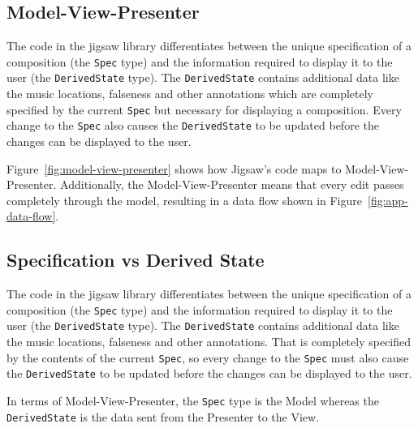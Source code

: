\documentclass[12pt]{article}
\begin{document}
\subsection{Model-View-Presenter}

The code in the jigsaw library differentiates between the unique specification of a composition
(the \verb|Spec| type) and the information required to display it to the user (the
\verb|DerivedState| type).  The \verb|DerivedState| contains additional data like the music
locations, falseness and other annotations which are completely specified by the current
\verb|Spec| but necessary for displaying a composition.  Every change to the \verb|Spec| also causes
the \verb|DerivedState| to be updated before the changes can be displayed to the user.

Figure~\ref{fig:model-view-presenter} shows how Jigsaw's code maps to Model-View-Presenter.
Additionally, the Model-View-Presenter means that every edit passes completely through the model,
resulting in a data flow shown in Figure~\ref{fig:app-data-flow}.

\subsection{Specification vs Derived State}

The code in the jigsaw library differentiates between the unique specification of a composition
(the \verb|Spec| type) and the information required to display it to the user (the
\verb|DerivedState| type).  The \verb|DerivedState| contains additional data like the music
locations, falseness and other annotations.  That is completely specified by the contents of the
current \verb|Spec|, so every change to the \verb|Spec| must also cause the \verb|DerivedState| to
be updated before the changes can be displayed to the user.

In terms of Model-View-Presenter, the \verb|Spec| type is the Model whereas the \verb|DerivedState|
is the data sent from the Presenter to the View.
\end{document}
